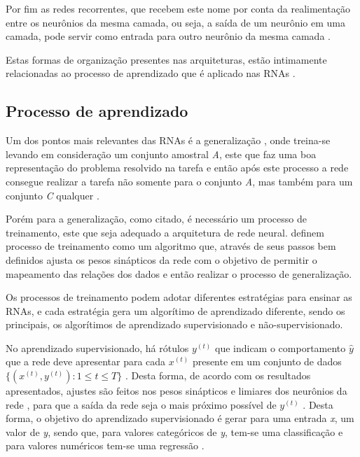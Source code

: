 \par Por fim as redes recorrentes, que recebem este nome por conta da realimentação entre os neurônios da mesma camada, ou seja, a saída de um neurônio em uma camada, pode servir como entrada para outro neurônio da mesma camada \cite{Nelson2017}.

\par Estas formas de organização presentes nas arquiteturas, estão intimamente relacionadas ao processo de aprendizado que é aplicado nas RNAs \cite{Haykin2001}.

\subsection{Processo de aprendizado}

\par Um dos pontos mais relevantes das RNAs é a generalização \cite{livroNunes2016}, onde treina-se levando em consideração um conjunto amostral \textit{A}, este que faz uma boa representação do problema resolvido na tarefa e então após este processo a rede consegue realizar a tarefa não somente para o conjunto \textit{A}, mas também para um conjunto \textit{C} qualquer \cite{livroNunes2016}.

\par Porém para a generalização, como citado, é necessário um processo de treinamento, este que seja adequado a arquitetura de rede neural.  definem processo de treinamento como um algoritmo que, através de seus passos bem definidos ajusta os pesos sinápticos da rede com o objetivo de permitir o mapeamento das relações dos dados e então realizar o processo de generalização. 

\par Os processos de treinamento podem adotar diferentes estratégias para ensinar as RNAs, e cada estratégia gera um algorítimo de aprendizado diferente, sendo os principais, os algorítimos de aprendizado supervisionado e não-supervisionado.

\par No aprendizado supervisionado, há rótulos $y^{(t)}$ que indicam o comportamento $\widehat{y}$ que a rede deve apresentar para cada $x^{(t)}$ presente em um conjunto de dados $\{(x^{(t)}, y^{(t)}): 1 \leqslant t \leqslant T\}$ \cite{bezerra2016}. Desta forma, de acordo com os resultados apresentados, ajustes são feitos nos pesos sinápticos e limiares dos neurônios da rede \cite{livroNunes2016}, para que a saída da rede seja o mais próximo possível de $y^{(t)}$ \cite{Osorio1999}. Desta forma, o objetivo do aprendizado supervisionado é gerar para uma entrada \textit{x}, um valor de \textit{y}, sendo que, para valores categóricos de \textit{y}, tem-se uma classificação e para valores numéricos tem-se uma regressão \cite{murphy2012}.

